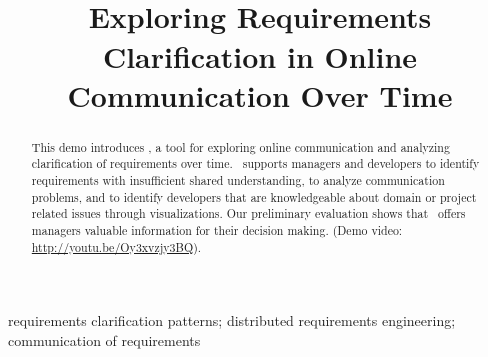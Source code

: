 
\title{\viss\\Exploring Requirements Clarification in Online Communication Over Time}


\author{
}

\maketitle


\begin{abstract}
This demo introduces \viss, a tool for exploring online communication and analyzing clarification of requirements over time.
\viss\ supports managers and developers to identify requirements with insufficient shared understanding, to analyze communication problems, and to identify developers that are knowledgeable about domain or project related issues through visualizations.
Our preliminary evaluation shows that \viss\ offers managers valuable information for their decision making.
(Demo video: \url{http://youtu.be/Oy3xvzjy3BQ}).
\end{abstract}

\begin{IEEEkeywords}
requirements clarification patterns; distributed requirements engineering; communication of requirements
\end{IEEEkeywords}
